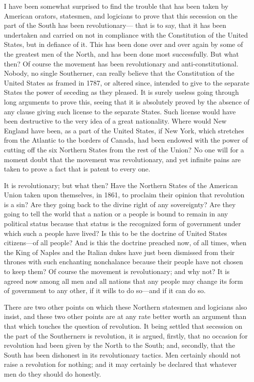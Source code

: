 I have been somewhat surprised to find the trouble that has been
taken by American orators, statesmen, and logicians to prove that
this secession on the part of the South has been revolutionary---%
that is to say, that it has been undertaken and carried on not in
compliance with the Constitution of the United States, but in
defiance of it.  This has been done over and over again by some of
the greatest men of the North, and has been done most successfully.
But what then?  Of course the movement has been revolutionary and
anti-constitutional.  Nobody, no single Southerner, can really
believe that the Constitution of the United States as framed in
1787, or altered since, intended to give to the separate States the
power of seceding as they pleased.  It is surely useless going
through long arguments to prove this, seeing that it is absolutely
proved by the absence of any clause giving such license to the
separate States.  Such license would have been destructive to the
very idea of a great nationality.  Where would New England have
been, as a part of the United States, if New York, which stretches
from the Atlantic to the borders of Canada, had been endowed with
the power of cutting off the six Northern States from the rest of
the Union?  No one will for a moment doubt that the movement was
revolutionary, and yet infinite pains are taken to prove a fact
that is patent to every one.

It is revolutionary; but what then?  Have the Northern States of
the American Union taken upon themselves, in 1861, to proclaim
their opinion that revolution is a sin?  Are they going back to the
divine right of any sovereignty?  Are they going to tell the world
that a nation or a people is bound to remain in any political
status because that status is the recognized form of government
under which such a people have lived?  Is this to be the doctrine
of United States citizens---of all people?  And is this the doctrine
preached now, of all times, when the King of Naples and the Italian
dukes have just been dismissed from their thrones with such
enchanting nonchalance because their people have not chosen to keep
them?  Of course the movement is revolutionary; and why not?  It is
agreed now among all men and all nations that any people may change
its form of government to any other, if it wills to do so---and if
it can do so.

There are two other points on which these Northern statesmen and
logicians also insist, and these two other points are at any rate
better worth an argument than that which touches the question of
revolution.  It being settled that secession on the part of the
Southerners is revolution, it is argued, firstly, that no occasion
for revolution had been given by the North to the South; and,
secondly, that the South has been dishonest in its revolutionary
tactics.  Men certainly should not raise a revolution for nothing;
and it may certainly be declared that whatever men do they should
do honestly.

